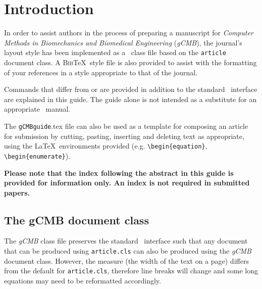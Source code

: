 \documentclass{gCMB2e}
\begin{document}
\section{Introduction}

In order to assist authors in the process of preparing a manuscript for {\itshape Computer Methods in Biomechanics and Biomedical Engineering} ({\it gCMB}), the journal's layout style has been implemented as a \LaTeXe\ class file based on the {\tt article} document class. A \textsc{Bib}\TeX\ style file is also provided to assist with the formatting of your references in a style appropriate to that of the journal.

Commands that differ from or are provided in addition to the standard \LaTeXe\ interface are explained in this guide. The guide alone is not intended as a substitute for an appropriate \LaTeXe\ manual.

The {\tt gCMBguide}.tex file can also be used as a template for composing an article for submission by cutting, pasting, inserting and
deleting text as appropriate, using the \LaTeX\ environments provided (e.g. \verb"\begin{equation}", \verb"\begin{enumerate}").

{\bf{Please note that the index following the abstract in this guide is provided for information only. An index is not required in submitted papers.}}


\subsection{The {\bi gCMB} document class}\label{S1.1}

The {\it gCMB} class file preserves the standard \LaTeXe\ interface such that any document that can
be produced using {\tt article.cls} can also be produced using the {\it gCMB} document class.
However, the measure (the width of the text on a page) differs from the default for {\tt article.cls}, therefore line breaks
will change and some long equations may need to be reformatted accordingly.
\end{document}
